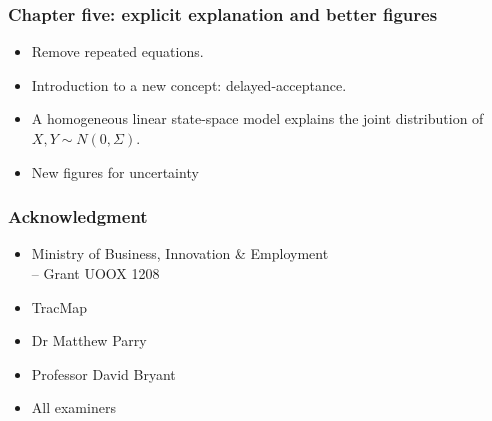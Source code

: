 \documentclass{beamer}
\begin{document}
\begin{frame}
\frametitle{Chapter five: explicit explanation and better figures}

\begin{itemize}
	\item Remove repeated equations.
	\item Introduction to a new concept: delayed-acceptance.
	\item A homogeneous linear state-space model explains the joint distribution of $X,Y \sim N(0,\Sigma)$.
	\item New figures for uncertainty 
	\begin{figure}[h]
		\centering
	\end{figure}
\end{itemize}


\end{frame}

\begin{frame}
\frametitle{Acknowledgment}
\begin{itemize}
\item Ministry of Business, Innovation \& Employment\\
 \hskip 0.5cm -- Grant UOOX 1208\\
\item TracMap\\
\item Dr Matthew Parry\\
\item Professor David Bryant \\
\item All examiners 
\end{itemize}
\end{frame}
\end{document}
